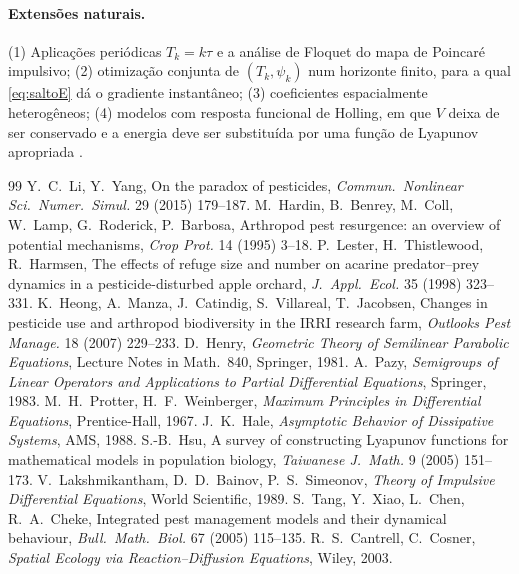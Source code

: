 \documentclass[11pt,a4paper]{article}
\numberwithin{equation}{section}
\theoremstyle{definition}
\theoremstyle{remark}
\begin{document}
\paragraph{Extensões naturais.} (1) Aplicações periódicas $T_k=k\tau$ e a análise de Floquet do
mapa de Poincaré impulsivo; (2) otimização conjunta de $(T_k,\psi_k)$ num horizonte finito, para a
qual \eqref{eq:saltoE} dá o gradiente instantâneo; (3) coeficientes espacialmente heterogêneos;
(4) modelos com resposta funcional de Holling, em que $V$ deixa de ser conservado e a energia deve
ser substituída por uma função de Lyapunov apropriada \cite{Hsu}.

\begin{thebibliography}{99}
 Y.~C.~Li, Y.~Yang, On the paradox of pesticides,
\emph{Commun.\ Nonlinear Sci.\ Numer.\ Simul.} 29 (2015) 179--187.
 M.~Hardin, B.~Benrey, M.~Coll, W.~Lamp, G.~Roderick, P.~Barbosa,
Arthropod pest resurgence: an overview of potential mechanisms, \emph{Crop Prot.} 14 (1995) 3--18.
 P.~Lester, H.~Thistlewood, R.~Harmsen, The effects of refuge size and number on
acarine predator--prey dynamics in a pesticide-disturbed apple orchard, \emph{J.\ Appl.\ Ecol.} 35
(1998) 323--331.
 K.~Heong, A.~Manza, J.~Catindig, S.~Villareal, T.~Jacobsen, Changes in pesticide use
and arthropod biodiversity in the IRRI research farm, \emph{Outlooks Pest Manage.} 18 (2007) 229--233.
 D.~Henry, \emph{Geometric Theory of Semilinear Parabolic Equations}, Lecture Notes in
Math.\ 840, Springer, 1981.
 A.~Pazy, \emph{Semigroups of Linear Operators and Applications to Partial Differential
Equations}, Springer, 1983.
 M.~H.~Protter, H.~F.~Weinberger, \emph{Maximum Principles in Differential
Equations}, Prentice-Hall, 1967.
 J.~K.~Hale, \emph{Asymptotic Behavior of Dissipative Systems}, AMS, 1988.
 S.-B.~Hsu, A survey of constructing Lyapunov functions for mathematical models in
population biology, \emph{Taiwanese J.\ Math.} 9 (2005) 151--173.
 V.~Lakshmikantham, D.~D.~Bainov, P.~S.~Simeonov, \emph{Theory of Impulsive
Differential Equations}, World Scientific, 1989.
 S.~Tang, Y.~Xiao, L.~Chen, R.~A.~Cheke, Integrated pest management models and their
dynamical behaviour, \emph{Bull.\ Math.\ Biol.} 67 (2005) 115--135.
 R.~S.~Cantrell, C.~Cosner, \emph{Spatial Ecology via Reaction--Diffusion
Equations}, Wiley, 2003.
\end{thebibliography}
\end{document}
